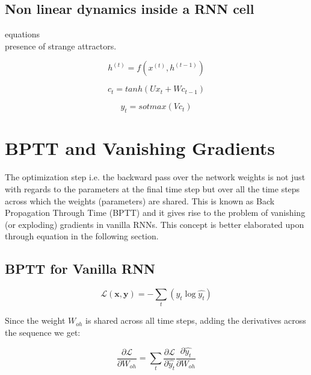 \subsection{Non linear dynamics inside a RNN cell}
equations\\
presence of strange attractors.

\begin{equation}\label{ndq}	
	h^{(t)} = f(x^{(t)}, h^{(t-1)})
\end{equation}

\begin{equation}
c_t = tanh(Ux_t + Wc_{t-1})
\end{equation}

\begin{equation}
y_t = sotmax(Vc_t)
\end{equation}


\section{BPTT and Vanishing Gradients}
The optimization step i.e. the backward pass over the network weights is not just with regards to the parameters at the final time step but over all the time steps across which the weights (parameters) are shared. This is known as Back Propagation Through Time (BPTT) and it gives rise to the problem of vanishing (or exploding) gradients in vanilla RNNs. This concept is better elaborated upon through equation in the following section.

\subsection{BPTT for Vanilla RNN}
\begin{equation}
\mathbf{\mathcal{L}\left(x,y\right)} = - \sum_{t}\left(y_t \log\hat{y_t}\right)
\end{equation}

Since the weight $W_{oh}$ is shared across all time steps, adding the derivatives across the sequence we get:

\begin{equation}
\frac{\partial \mathbf{\mathcal{L}}}{\partial W_{oh}} = \sum_{t}\frac{\partial \mathbf{\mathcal{L}}}{\partial \hat{y_t}} \frac{\partial  \hat{y_t}}{\partial W_{oh}}
\end{equation}

